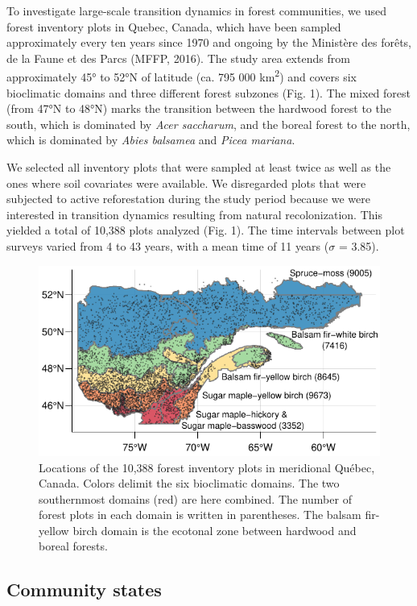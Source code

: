 \documentclass[a4paperpaper,]{article}
\begin{document}
To investigate large-scale transition dynamics in forest communities, we
used forest inventory plots in Quebec, Canada, which have been sampled
approximately every ten years since 1970 and ongoing by the Ministère
des forêts, de la Faune et des Parcs (MFFP, 2016). The study area
extends from approximately 45° to 52°N of latitude (ca. 795 000
km\textsuperscript{2}) and covers six bioclimatic domains and three
different forest subzones (Fig. 1). The mixed forest (from 47°N to 48°N)
marks the transition between the hardwood forest to the south, which is
dominated by \emph{Acer saccharum}, and the boreal forest to the north,
which is dominated by \emph{Abies balsamea} and \emph{Picea mariana}.

We selected all inventory plots that were sampled at least twice as well
as the ones where soil covariates were available. We disregarded plots
that were subjected to active reforestation during the study period
because we were interested in transition dynamics resulting from natural
recolonization. This yielded a total of 10,388 plots analyzed (Fig. 1).
The time intervals between plot surveys varied from 4 to 43 years, with
a mean time of 11 years (\(\sigma\) = 3.85).

\begin{figure}
\centering
\includegraphics{res/fig1_region.pdf}
\caption{Locations of the 10,388 forest inventory plots in meridional
Québec, Canada. Colors delimit the six bioclimatic domains. The two
southernmost domains (red) are here combined. The number of forest plots
in each domain is written in parentheses. The balsam fir-yellow birch
domain is the ecotonal zone between hardwood and boreal forests.}
\end{figure}

\hypertarget{community-states}{%
\subsection{Community states}\label{community-states}}
\end{document}
